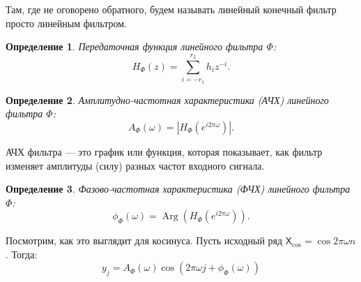 \documentclass[a4paper, 11pt]{article}
\newcommand{\TS}{\mathsf{X}}
\newtheorem{definition}{Определение} %
\begin{document}
Там, где не оговорено обратного, будем называть линейный конечный фильтр просто линейным фильтром.

\begin{definition}
	Передаточная функция линейного фильтра $\Phi$:
	\begin{equation*}
		H_{\Phi}(z) = \sum \limits_{i = -r_1}^{r_2} h_i z^{-i}.
	\end{equation*}
\end{definition}

\begin{definition}
	Амплитудно-частотная характеристика (АЧХ) линейного фильтра $\Phi$:
	\begin{equation*}
		A_{\Phi}(\omega) = \left| H_{\Phi}\left(e^{i2\pi\omega}\right) \right|.
	\end{equation*}
\end{definition}

АЧХ фильтра  — это график или функция, которая показывает, как фильтр изменяет амплитуды (силу) разных частот входного сигнала.

\begin{definition}
	Фазово-частотная характеристика (ФЧХ) линейного фильтра $\Phi$:
	\begin{equation*}
		\phi_{\Phi}(\omega) = \operatorname{Arg}\left(H_{\Phi}\left(e^{i2\pi\omega}\right)\right).
	\end{equation*}
\end{definition}

Посмотрим, как это выглядит для косинуса. Пусть исходный ряд $\TS_{\cos} = \cos{2\pi \omega n}$. Тогда:
\begin{equation*}
	y_j = A_{\Phi}(\omega) \cos\left(2\pi\omega j + \phi_{\Phi}(\omega) \right)
\end{equation*}
\end{document}
